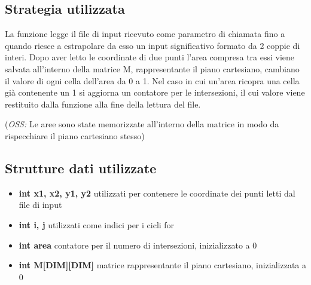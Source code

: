 \documentclass[11pt, a4paper, titlepage]{article}
\begin{document}
        \subsection{Strategia utilizzata}
            La funzione legge il file di input ricevuto come parametro di chiamata fino a quando riesce a estrapolare
            da esso un input significativo formato da 2 coppie di interi. Dopo aver letto le coordinate di due punti
            l'area compresa tra essi viene salvata all'interno della matrice M, rappresentante il piano cartesiano,
            cambiano il valore di ogni cella dell'area da 0 a 1. Nel caso in cui un'area ricopra una cella già contenente un 1 si aggiorna un contatore
            per le intersezioni, il cui valore viene restituito dalla funzione alla fine della lettura del file.

            (\emph{OSS:} Le aree sono state memorizzate all'interno della matrice in modo da rispecchiare il piano cartesiano
            stesso)

        \subsection{Strutture dati utilizzate}
            \begin{itemize}
                \item \textbf{int x1, x2, y1, y2} utilizzati per contenere le coordinate dei punti letti dal file di input
                \item \textbf{int i, j} utilizzati come indici per i cicli for
                \item \textbf{int area} contatore per il numero di intersezioni, inizializzato a 0
                \item \textbf{int M[DIM][DIM]} matrice rappresentante il piano cartesiano, inizializzata a 0
            \end{itemize}
               
\end{document}
